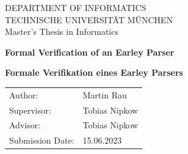 \documentclass[headsepline,footsepline,footinclude=false,oneside,fontsize=11pt,paper=a4,listof=totoc,bibliography=totoc]{scrbook} %
\newcommand*{\getUniversity}{Technische Universität München}
\newcommand*{\getFaculty}{Department of Informatics}
\newcommand*{\getTitle}{Formal Verification of an Earley Parser}
\newcommand*{\getTitleGer}{Formale Verifikation eines Earley Parsers}
\newcommand*{\getAuthor}{Martin Rau}
\newcommand*{\getDoctype}{Master's Thesis in Informatics}
\newcommand*{\getSupervisor}{Tobias Nipkow}
\newcommand*{\getAdvisor}{Tobias Nipkow}
\newcommand*{\getSubmissionDate}{15.06.2023}
\begin{document}
\frontmatter{}


\begin{titlepage}
  \centering


  \vspace{5mm}
  {\huge\MakeUppercase{\getFaculty{}}}\\

  \vspace{5mm}
  {\large\MakeUppercase{\getUniversity{}}}\\

  \vspace{20mm}
  {\Large \getDoctype{}}

  \vspace{15mm}
  {\huge\bfseries \getTitle{} \par}

  \vspace{10mm}
  {\huge\bfseries \foreignlanguage{ngerman}{\getTitleGer{}} \par}

  \vspace{15mm}
  \begin{tabular}{l l}
    Author:          & \getAuthor{} \\
    Supervisor:      & \getSupervisor{} \\
    Advisor:         & \getAdvisor{} \\
    Submission Date: & \getSubmissionDate{} \\
  \end{tabular}

\end{titlepage}
\end{document}
